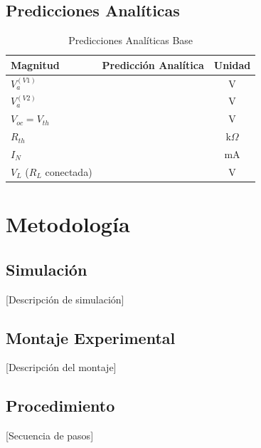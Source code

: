 \documentclass[journal, a4paper]{IEEEtran}
\begin{document}
\subsection{Predicciones Analíticas}
\begin{table}[htbp]
    \centering
    \caption{Predicciones Analíticas Base}
    \label{tab:predicciones_a}
    \begin{tabularx}{\columnwidth}{>{\RaggedRight\arraybackslash}X >{\centering\arraybackslash}X c}
        \toprule
        \textbf{Magnitud} & \textbf{Predicción Analítica} & \textbf{Unidad} \\
        \midrule
        $V_{a}^{(V1)}$ & & V \\
        $V_{a}^{(V2)}$ & & V \\
        $V_{oc} = V_{th}$ & & V \\
        $R_{th}$ & & k$\Omega$ \\
        $I_{N}$ & & mA \\
        $V_L$ ($R_L$ conectada) & & V \\
        \bottomrule
    \end{tabularx}
\end{table}

\section{Metodología}
\subsection{Simulación}
[Descripción de simulación]

\subsection{Montaje Experimental}
[Descripción del montaje]

\subsection{Procedimiento}
[Secuencia de pasos]
\end{document}
